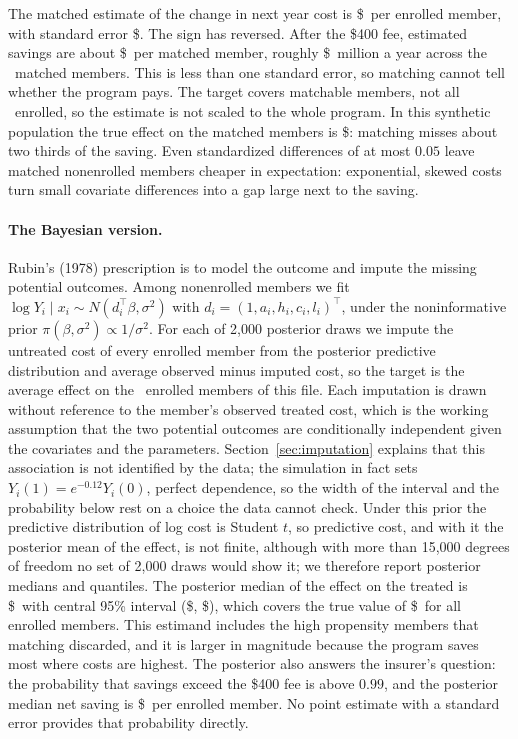 The matched estimate of the change in next year cost is \$\hcmatch\ per enrolled member, with standard error \$\hcmatchse. The sign has reversed. After the \$400 fee, estimated savings are about \$\hcnetmatch\ per matched member, roughly \$\hcnetbook\ million a year across the \hcnmatch\ matched members. This is less than one standard error, so matching cannot tell whether the program pays. The target covers matchable members, not all \hcntreat\ enrolled, so the estimate is not scaled to the whole program. In this synthetic population the true effect on the matched members is \$\hctruthm: matching misses about two thirds of the saving. Even standardized differences of at most $0.05$ leave matched nonenrolled members cheaper in expectation: exponential, skewed costs turn small covariate differences into a gap large next to the saving.

\paragraph{The Bayesian version.} Rubin's (1978) prescription is to model the outcome and impute the missing potential outcomes. Among nonenrolled members we fit $\log Y_i \mid x_i \sim N(d_i^\top\beta, \sigma^2)$ with $d_i = (1, a_i, h_i, c_i, l_i)^\top$, under the noninformative prior $\pi(\beta, \sigma^2) \propto 1/\sigma^2$. For each of 2,000 posterior draws we impute the untreated cost of every enrolled member from the posterior predictive distribution and average observed minus imputed cost, so the target is the average effect on the \hcntreat\ enrolled members of this file. Each imputation is drawn without reference to the member's observed treated cost, which is the working assumption that the two potential outcomes are conditionally independent given the covariates and the parameters. Section~\ref{sec:imputation} explains that this association is not identified by the data; the simulation in fact sets $Y_i(1) = e^{-0.12} Y_i(0)$, perfect dependence, so the width of the interval and the probability below rest on a choice the data cannot check. Under this prior the predictive distribution of log cost is Student $t$, so predictive cost, and with it the posterior mean of the effect, is not finite, although with more than 15,000 degrees of freedom no set of 2,000 draws would show it; we therefore report posterior medians and quantiles. The posterior median of the effect on the treated is \$\hcbayes\ with central 95\% interval (\$\hcbayeslo, \$\hcbayeshi), which covers the true value of \$\hctruth\ for all enrolled members. This estimand includes the high propensity members that matching discarded, and it is larger in magnitude because the program saves most where costs are highest. The posterior also answers the insurer's question: the probability that savings exceed the \$400 fee is above $0.99$, and the posterior median net saving is \$\hcnetbayes\ per enrolled member. No point estimate with a standard error provides that probability directly.

